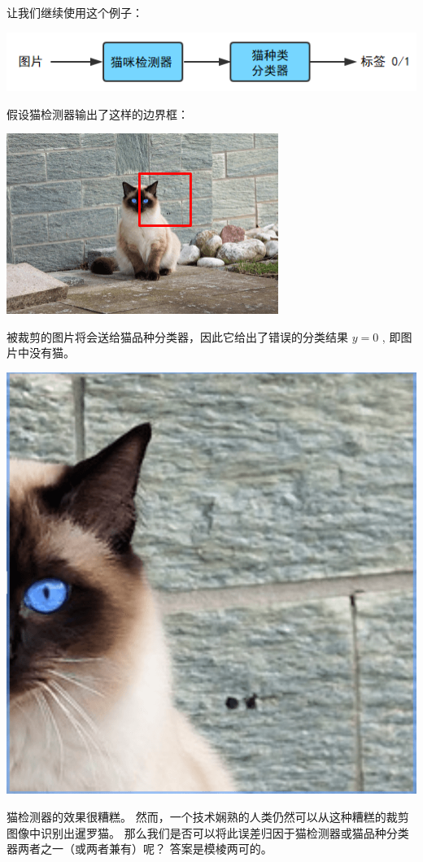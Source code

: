 让我们继续使用这个例子：

\includegraphics{./img/ch51_04.png}

假设猫检测器输出了这样的边界框：

\includegraphics{./img/ch54_01.png}

被裁剪的图片将会送给猫品种分类器，因此它给出了错误的分类结果 \(y=0\) ,
即图片中没有猫。

\includegraphics{./img/ch54_02.png}

猫检测器的效果很糟糕。
然而，一个技术娴熟的人类仍然可以从这种糟糕的裁剪图像中识别出暹罗猫。
那么我们是否可以将此误差归因于猫检测器或猫品种分类器两者之一（或两者兼有）呢？
答案是模棱两可的。

